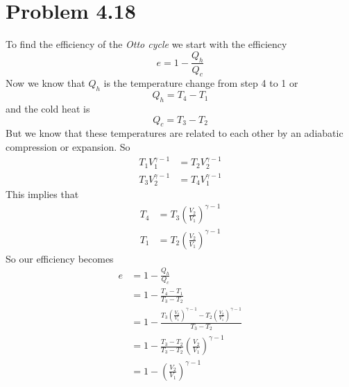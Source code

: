 \documentclass[11pt]{article}
\numberwithin{equation}{section}
\begin{document}
\section{Problem 4.18}
To find the efficiency of the \emph{Otto cycle} we start with the efficiency 
$$e = 1-\frac{Q_h}{Q_c}$$
Now we know that $Q_h$ is the temperature change from step 4 to 1 or 
$$Q_h = T_4-T_1$$
and the cold heat is
$$Q_c = T_3-T_2$$
But we know that these temperatures are related to each other by an adiabatic compression or expansion. So
\begin{align*}
T_1V_1^{\gamma-1} &= T_2V_2^{\gamma-1}\\
T_3V_2^{\gamma-1} &= T_4V_1^{\gamma-1}
\end{align*}
This implies that 
\begin{align*}
T_4 &= T_3\left(\frac{V_2}{V_1}\right)^{\gamma-1}\\
T_1 &= T_2\left(\frac{V_2}{V_1}\right)^{\gamma-1}
\end{align*}
So our efficiency becomes
\begin{align*}
e &= 1 - \frac{Q_h}{Q_c}\\
&= 1 - \frac{T_4-T_1}{T_3-T_2}\\
&= 1 - \frac{T_3\left(\frac{V_2}{V_1}\right)^{\gamma-1} - T_2\left(\frac{V_2}{V_1}\right)^{\gamma-1}}{T_3-T_2}\\
&= 1 - \frac{T_3 - T_2}{T_3-T_2}\left(\frac{V_2}{V_1}\right)^{\gamma-1}\\
&= 1 - \left(\frac{V_2}{V_1}\right)^{\gamma-1}
\end{align*}
\end{document}
